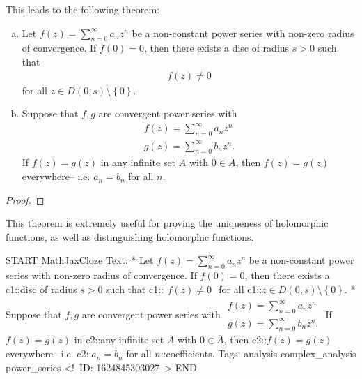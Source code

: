 \documentclass{memoir}
\begin{document}
This leads to the following theorem:
\begin{thm}
	\begin{enumerate}[(a).]
		\item Let \(f(z) = \sum_{n=0}^{\infty} a_n z^{n}\) be a non-constant power series with non-zero radius of convergence. If \(f(0) = 0\), then there exists a disc of radius \(s>0\) such that
			\begin{align*}
				f(z)\neq 0
			\end{align*}
			for all \(z \in D(0,s)\setminus\left\{ 0 \right\} \).
		\item Suppose that \(f,g\) are convergent power series with
			\begin{align*}
				f(z) = \sum_{n=0}^{\infty} a_n z^n\\
				g(z) = \sum_{n=0}^{\infty} b_n z^{n}.
			\end{align*}
			If \(f(z)=g(z)\) in any infinite set \(A\) with \(0 \in \overline{A}\), then \(f(z)=g(z)\) everywhere-- i.e. \(a_n = b_n\) for all \(n\).
	\end{enumerate}
\end{thm}
\begin{proof}
	
\end{proof}
This theorem is extremely useful for proving the uniqueness of holomorphic functions, as well as distinguishing holomorphic functions.

\begin{anki}
START
MathJaxCloze
Text: 
* Let \(f(z) = \sum_{n=0}^{\infty} a_n z^{n}\) be a non-constant power series with non-zero radius of convergence. If \(f(0) = 0\), then there exists a {{c1::disc of radius \(s>0\)}} such that
{{c1::\(\begin{align*}
        f(z)\neq 0
        \end{align*}\)}} 
for all {{c1::\(z \in D(0,s)\setminus\left\{ 0 \right\} \)}}.
* Suppose that \(f,g\) are convergent power series with
\(\begin{align*}
  f(z) = \sum_{n=0}^{\infty} a_n z^n\\
  g(z) = \sum_{n=0}^{\infty} b_n z^{n}.
  \end{align*}\)
If \(f(z)=g(z)\) in {{c2::any infinite set \(A\) with \(0 \in \overline{A}\)}}, then {{c2::\(f(z)=g(z)\) everywhere}}-- i.e. {{c2::\(a_n = b_n\) for all \(n\)::coefficients}}.
Tags: analysis complex_analysis power_series
<!--ID: 1624845303027-->
END
\end{anki}
\end{document}
